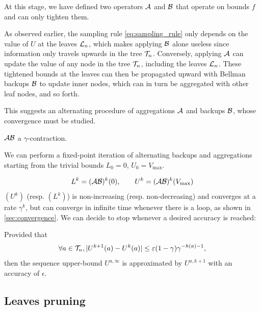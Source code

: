 \documentclass[runningheads]{llncs}
\begin{document}
At this stage, we have defined two operators $\mathcal{A}$ and $\mathcal{B}$ that operate on bounds $f$ and can only tighten them.


\begin{remark}
As observed earlier, the sampling rule \eqref{eq:sampling_rule} only depends on the value of $U$ at the leaves $\mathcal{L}_n$, which makes applying $\mathcal{B}$ alone useless since information only travels upwards in the tree $\mathcal{T}_n$. Conversely, applying $\mathcal{A}$ can update the value of any node in the tree $\mathcal{T}_n$, including the leaves $\mathcal{L}_n$. These tightened bounds at the leaves can then be propagated upward with Bellman backups $\mathcal{B}$ to update inner nodes, which can in turn be aggregated with other leaf nodes, and so forth.
\end{remark}

This suggests an alternating procedure of aggregations $\mathcal{A}$ and backups $\mathcal{B}$, whose convergence must be studied.

\begin{proposition}[Contractivity of $\cA\cB$]
\label{prop:contractivity}
$\cA\cB$ a $\gamma$-contraction.
\end{proposition}

We can perform a fixed-point iteration of alternating backups and aggregations starting from the trivial bounds $L_0=0$, $U_0 = V_{\max}$.

\begin{equation}
    \label{eq:recursion}
    L^k = (\mathcal{A} \mathcal{B})^k(0), \qquad
    U^k = (\mathcal{A} \mathcal{B})^k(V_{\max})
\end{equation}
$(U^k)$ (resp. $(L^k)$) is non-increasing (resp. non-decreasing) and converges at a rate $\gamma^k$, but can converge in infinite time whenever there is a loop, as shown in \autoref{sec:convergence}. We can decide to stop whenever a desired accuracy is reached: 

\begin{proposition}
\label{prop:early-stopping}
Provided that
\[\forall a\in\mathcal{T}_n, |U^{k+1}(a) - U^k(a)| \leq \varepsilon (1-\gamma)\gamma^{-h(a)-1},\]
then the sequence upper-bound $U^{a,\infty}$ is approximated by $U^{a,k+1}$ with an accuracy of $\epsilon$.
\end{proposition}

\subsection{Leaves pruning}
\label{sec:pruning}
\end{document}
